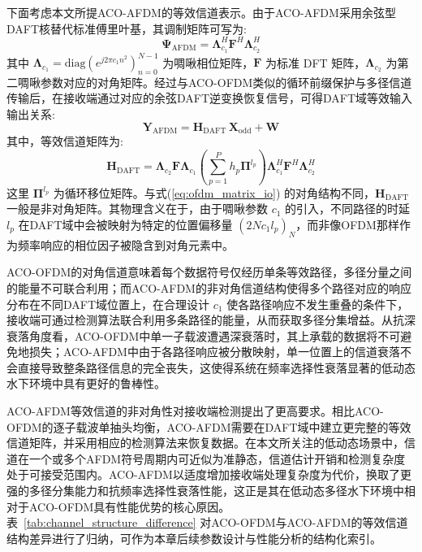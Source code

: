 下面考虑本文所提ACO-AFDM的等效信道表示。由于ACO-AFDM采用余弦型DAFT核替代标准傅里叶基，其调制矩阵可写为:
\begin{equation}
    \boldsymbol{\Psi}_{\mathrm{AFDM}} = \boldsymbol{\Lambda}_{c_1}^{H} \mathbf{F}^{H} \boldsymbol{\Lambda}_{c_2}^{H}
\end{equation}
其中 $\boldsymbol{\Lambda}_{c_1}=\mathrm{diag}(e^{j2\pi c_1 n^2})_{n=0}^{N-1}$ 为啁啾相位矩阵，$\mathbf{F}$ 为标准 DFT 矩阵，$\boldsymbol{\Lambda}_{c_2}$ 为第二啁啾参数对应的对角矩阵。经过与ACO-OFDM类似的循环前缀保护与多径信道传输后，在接收端通过对应的余弦DAFT逆变换恢复信号，可得DAFT域等效输入输出关系:
\begin{equation}
    \mathbf{Y}_{\mathrm{AFDM}} = \mathbf{H}_{\mathrm{DAFT}} \, \mathbf{X}_{\mathrm{odd}} + \mathbf{W}
    \label{eq:afdm_matrix_io}
\end{equation}
其中，等效信道矩阵为:
\begin{equation}
    \mathbf{H}_{\mathrm{DAFT}} = \boldsymbol{\Lambda}_{c_2} \mathbf{F} \boldsymbol{\Lambda}_{c_1} \left( \sum_{p=1}^{P} h_p \boldsymbol{\Pi}^{l_p} \right) \boldsymbol{\Lambda}_{c_1}^{H} \mathbf{F}^{H} \boldsymbol{\Lambda}_{c_2}^{H}
    \label{eq:afdm_equiv_channel}
\end{equation}
这里 $\boldsymbol{\Pi}^{l_p}$ 为循环移位矩阵。与式(\ref{eq:ofdm_matrix_io}) 的对角结构不同，$\mathbf{H}_{\mathrm{DAFT}}$ 一般是非对角矩阵。其物理含义在于，由于啁啾参数 $c_1$ 的引入，不同路径的时延 $l_p$ 在DAFT域中会被映射为特定的位置偏移量 $(2Nc_1 l_p)_N$，而非像OFDM那样作为频率响应的相位因子被隐含到对角元素中。

ACO-OFDM的对角信道意味着每个数据符号仅经历单条等效路径，多径分量之间的能量不可联合利用；而ACO-AFDM的非对角信道结构使得多个路径对应的响应分布在不同DAFT域位置上，在合理设计 $c_1$ 使各路径响应不发生重叠的条件下，接收端可通过检测算法联合利用多条路径的能量，从而获取多径分集增益。从抗深衰落角度看，ACO-OFDM中单一子载波遭遇深衰落时，其上承载的数据将不可避免地损失；ACO-AFDM中由于各路径响应被分散映射，单一位置上的信道衰落不会直接导致整条路径信息的完全丧失，这使得系统在频率选择性衰落显著的低动态水下环境中具有更好的鲁棒性。

ACO-AFDM等效信道的非对角性对接收端检测提出了更高要求。相比ACO-OFDM的逐子载波单抽头均衡，ACO-AFDM需要在DAFT域中建立更完整的等效信道矩阵，并采用相应的检测算法来恢复数据。在本文所关注的低动态场景中，信道在一个或多个AFDM符号周期内可近似为准静态，信道估计开销和检测复杂度处于可接受范围内。ACO-AFDM以适度增加接收端处理复杂度为代价，换取了更强的多径分集能力和抗频率选择性衰落性能，这正是其在低动态多径水下环境中相对于ACO-OFDM具有性能优势的核心原因。表~\ref{tab:channel_structure_difference} 对ACO-OFDM与ACO-AFDM的等效信道结构差异进行了归纳，可作为本章后续参数设计与性能分析的结构化索引。

